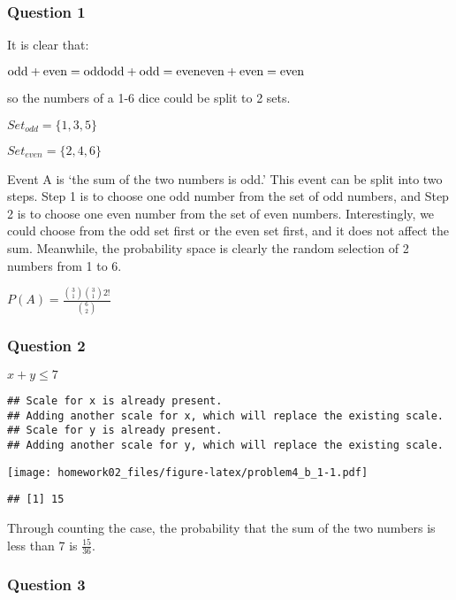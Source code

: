 \documentclass[
]{article}
\begin{document}
\hypertarget{question-1-1}{%
\subsubsection{Question 1}\label{question-1-1}}

It is clear that:

\(\text{odd}+\text{even}=\text{odd}\\\text{odd}+\text{odd}=\text{even}\\\text{even}+\text{even}=\text{even}\)

so the numbers of a 1-6 dice could be split to 2 sets.

\(Set_{odd}=\{1, 3, 5\}\)

\(Set_{even}=\{2, 4, 6\}\)

Event A is `the sum of the two numbers is odd.' This event can be split
into two steps. Step 1 is to choose one odd number from the set of odd
numbers, and Step 2 is to choose one even number from the set of even
numbers. Interestingly, we could choose from the odd set first or the
even set first, and it does not affect the sum. Meanwhile, the
probability space is clearly the random selection of 2 numbers from 1 to
6.

\(P(A)=\frac{\binom{3}{1}\binom{3}{1}2!}{\binom{6}{2}}\)

\hypertarget{question-2-1}{%
\subsubsection{Question 2}\label{question-2-1}}

\(x+y\leq7\)

\begin{verbatim}
## Scale for x is already present.
## Adding another scale for x, which will replace the existing scale.
## Scale for y is already present.
## Adding another scale for y, which will replace the existing scale.
\end{verbatim}

\texttt{[image: homework02\_files/figure-latex/problem4\_b\_1-1.pdf]}

\begin{verbatim}
## [1] 15
\end{verbatim}

Through counting the case, the probability that the sum of the two
numbers is less than 7 is \(\frac{15}{36}\).

\hypertarget{question-3}{%
\subsubsection{Question 3}\label{question-3}}
\end{document}
